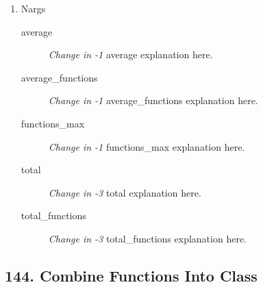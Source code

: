 \begin{enumerate}
      \item Nargs
            \begin{description}
                  \item [average] \textit{Change in -1} average explanation here.
                  \item [average\_functions] \textit{Change in -1} average\_functions explanation here.
                  \item [functions\_max] \textit{Change in -1} functions\_max explanation here.
                  \item [total] \textit{Change in -3} total explanation here.
                  \item [total\_functions] \textit{Change in -3} total\_functions explanation here.
            \end{description}
\end{enumerate}
\subsection{ 144.  Combine Functions Into Class }

